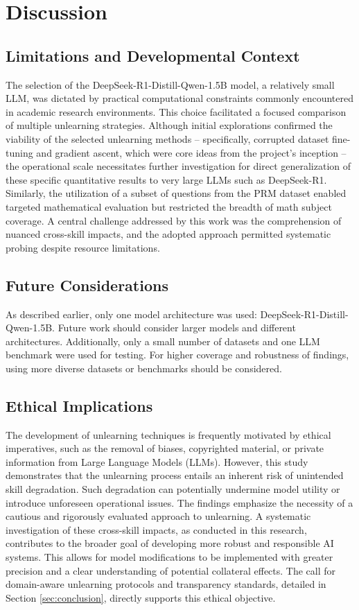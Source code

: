 \documentclass[10pt]{article}
\begin{document}
\section{Discussion}
\subsection{Limitations and Developmental Context}
The selection of the DeepSeek-R1-Distill-Qwen-1.5B model, a relatively small LLM, was dictated by practical computational constraints commonly encountered in academic research environments. This choice facilitated a focused comparison of multiple unlearning strategies. Although initial explorations confirmed the viability of the selected unlearning methods – specifically, corrupted dataset fine-tuning and gradient ascent, which were core ideas from the project's inception – the operational scale necessitates further investigation for direct generalization of these specific quantitative results to very large LLMs such as DeepSeek-R1. Similarly, the utilization of a subset of questions from the PRM dataset \cite{lightman2023lets} enabled targeted mathematical evaluation but restricted the breadth of math subject coverage. A central challenge addressed by this work was the comprehension of nuanced cross-skill impacts, and the adopted approach permitted systematic probing despite resource limitations.

\subsection{Future Considerations}
As described earlier, only one model architecture was used: DeepSeek-R1-Distill-Qwen-1.5B. Future work should consider larger models and different architectures. Additionally, only a small number of datasets and one LLM benchmark were used for testing. For higher coverage and robustness of findings, using more diverse datasets or benchmarks should be considered.

\subsection{Ethical Implications}
The development of unlearning techniques is frequently motivated by ethical imperatives, such as the removal of biases, copyrighted material, or private information from Large Language Models (LLMs). However, this study demonstrates that the unlearning process entails an inherent risk of unintended skill degradation. Such degradation can potentially undermine model utility or introduce unforeseen operational issues. The findings emphasize the necessity of a cautious and rigorously evaluated approach to unlearning. A systematic investigation of these cross-skill impacts, as conducted in this research, contributes to the broader goal of developing more robust and responsible AI systems. This allows for model modifications to be implemented with greater precision and a clear understanding of potential collateral effects. The call for domain-aware unlearning protocols and transparency standards, detailed in Section \ref{sec:conclusion}, directly supports this ethical objective.
\end{document}
